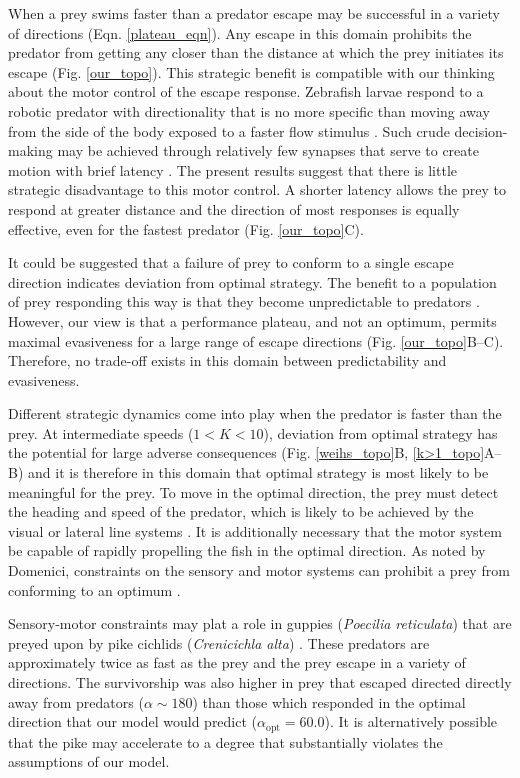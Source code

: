 \documentclass[12pt]{article}
\begin{document}
When a prey swims faster than a predator escape may be successful in a variety of directions (Eqn. \ref{plateau_eqn}). Any escape in this domain prohibits the predator from getting any closer than the distance at which the prey initiates its escape (Fig. \ref{our_topo}). This strategic benefit is compatible with our thinking about the motor control of the escape response. 
Zebrafish larvae respond to a robotic predator with directionality that is no more specific than moving away from the side of the body exposed to a faster flow stimulus \citep{Stewart:2014cm}. Such crude decision-making may be achieved through relatively few synapses that serve to create motion with brief latency \citep{Liu:1999fs}. 
The present results suggest that there is little strategic disadvantage to this motor control. A shorter latency allows the prey to respond at greater distance and the direction of most responses is equally effective, even for the fastest predator (Fig. \ref{our_topo}C). 

It could be suggested that a failure of prey to conform to a single escape direction indicates deviation from optimal strategy. The benefit to a population of prey responding this way is that they become unpredictable to predators \citep{Humphries:1970hy}. However, our view is that a performance plateau, and not an optimum, permits maximal evasiveness for a large range of escape directions (Fig. \ref{our_topo}B--C). Therefore, no trade-off exists in this domain between predictability and evasiveness.

Different strategic dynamics come into play when the predator is faster than the prey. At intermediate speeds ($1<K<10$), deviation from optimal strategy has the potential for large adverse consequences (Fig. \ref{weihs_topo}B, \ref{k>1_topo}A--B) and it is therefore in this domain that optimal strategy is most likely to be meaningful for the prey. 
To move in the optimal direction, the prey must detect the heading and speed of the predator, which is likely to be achieved by the visual or lateral line systems \citep{Stewart:2013bh, Dill:1974ws, Paglianti:2006gg, Higgs:1996uu}. It is additionally necessary that the motor system be capable of rapidly propelling the fish in the optimal direction. As noted by Domenici, constraints on the sensory and motor systems can prohibit a prey from conforming to an optimum \citep{Domenici:2011tv}. 

Sensory-motor constraints may plat a role in guppies (\textit{Poecilia reticulata}) that are preyed upon by pike cichlids (\textit{Crenicichla alta}) \citep{Walker:2005bb}. These predators are approximately twice as fast as the prey and the prey escape in a variety of directions. The survivorship was also higher in prey that escaped directed directly away from predators ($\alpha \sim 180$\textdegree) than those which responded in the optimal direction that our model would predict ($\alpha_{\text{opt}}=60.0$\textdegree). It is alternatively possible that the pike may accelerate to a degree that substantially violates the assumptions of our model.
\end{document}
